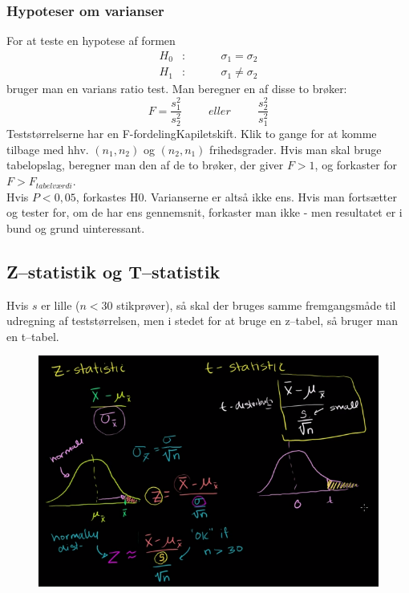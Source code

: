 \documentclass[11pt]{article}
\begin{document}
\subsubsection{Hypoteser om varianser}
For at teste en hypotese af formen
\begin{eqnarray*}
H_0&:&\hspace{1cm}\sigma_1 = \sigma_2\\
H_1&:&\hspace{1cm}\sigma_1 \neq \sigma_2
\end{eqnarray*}
bruger man en varians ratio test. Man beregner en af disse to brøker:
$$F=\frac{s_1^2}{s_2^2}\hspace{1cm}eller\hspace{1cm}\frac{s_2^2}{s_1^2}$$
Teststørrelserne har en F-fordelingKapiletskift. Klik to gange for at komme tilbage med hhv. $(n_1,n_2)$ og $(n_2,n_1)$ frihedsgrader. Hvis man skal bruge tabelopslag, beregner man den af de to brøker, der giver $F>1$, og forkaster for $F > F_{tabelværdi}$.\\[0.2cm]
Hvis $P < 0,05$, forkastes H0. Varianserne er altså ikke ens. Hvis man fortsætter og tester for, om de har ens gennemsnit, forkaster man ikke - men resultatet er i bund og grund uinteressant.

\subsection{Z--statistik og T--statistik}
Hvis $s$ er lille ($n<30$ stikprøver), så skal der bruges samme fremgangsmåde til udregning af teststørrelsen, men i stedet for at bruge en z--tabel, så bruger man en t--tabel. 

\begin{figure}[H]
\centering
\includegraphics[scale=0.5]{img/Selection_016}
\end{figure}
\end{document}
